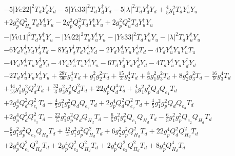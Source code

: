 {\begin{align}
 &-5 |Ye22|^2 {T_d  Y_{d}^{\dagger}  Y_d} -5 |Ye33|^2 {T_d  Y_{d}^{\dagger}  Y_d} -5 |\lambda|^2 {T_d  Y_{d}^{\dagger}  Y_d} +\frac{4}{5} g_{1}^{2} {T_d  Y_{u}^{\dagger}  Y_u} \nonumber \\ 
 &+2 g_{p}^{2} Q_{H_u}^{2} {T_d  Y_{u}^{\dagger}  Y_u} -2 g_{p}^{2} Q_{q}^{2} {T_d  Y_{u}^{\dagger}  Y_u} +2 g_{p}^{2} Q_{u}^{2} {T_d  Y_{u}^{\dagger}  Y_u} \nonumber \\ 
 &- |Yv11|^2 {T_d  Y_{u}^{\dagger}  Y_u} - |Yv22|^2 {T_d  Y_{u}^{\dagger}  Y_u} - |Yv33|^2 {T_d  Y_{u}^{\dagger}  Y_u} - |\lambda|^2 {T_d  Y_{u}^{\dagger}  Y_u} \nonumber \\ 
 &-6 {Y_d  Y_{d}^{\dagger}  Y_d  Y_{d}^{\dagger}  T_d} -8 {Y_d  Y_{d}^{\dagger}  T_d  Y_{d}^{\dagger}  Y_d} -2 {Y_d  Y_{u}^{\dagger}  Y_u  Y_{d}^{\dagger}  T_d} -4 {Y_d  Y_{u}^{\dagger}  Y_u  Y_{u}^{\dagger}  T_u} \nonumber \\ 
 &-4 {Y_d  Y_{u}^{\dagger}  T_u  Y_{d}^{\dagger}  Y_d} -4 {Y_d  Y_{u}^{\dagger}  T_u  Y_{u}^{\dagger}  Y_u} -6 {T_d  Y_{d}^{\dagger}  Y_d  Y_{d}^{\dagger}  Y_d} -4 {T_d  Y_{u}^{\dagger}  Y_u  Y_{d}^{\dagger}  Y_d} \nonumber \\ 
 &-2 {T_d  Y_{u}^{\dagger}  Y_u  Y_{u}^{\dagger}  Y_u} +\frac{287}{90} g_{1}^{4} T_d +g_{1}^{2} g_{2}^{2} T_d +\frac{15}{2} g_{2}^{4} T_d +\frac{8}{9} g_{1}^{2} g_{3}^{2} T_d +8 g_{2}^{2} g_{3}^{2} T_d -\frac{16}{9} g_{3}^{4} T_d \nonumber \\ 
 &+\frac{44}{15} g_{1}^{2} g_{p}^{2} Q_{d}^{2} T_d +\frac{32}{3} g_{3}^{2} g_{p}^{2} Q_{d}^{2} T_d +22 g_{p}^{4} Q_{d}^{4} T_d +\frac{4}{5} g_{1}^{2} g_{p}^{2} Q_{d} Q_{e_{1}} T_d \nonumber \\ 
 &+2 g_{p}^{4} Q_{d}^{2} Q_{e_{1}}^{2} T_d +\frac{4}{5} g_{1}^{2} g_{p}^{2} Q_{d} Q_{e_{2}} T_d +2 g_{p}^{4} Q_{d}^{2} Q_{e_{2}}^{2} T_d +\frac{4}{5} g_{1}^{2} g_{p}^{2} Q_{d} Q_{e_3} T_d \nonumber \\ 
 &+2 g_{p}^{4} Q_{d}^{2} Q_{e_3}^{2} T_d -\frac{22}{5} g_{1}^{2} g_{p}^{2} Q_{d} Q_{H_d} T_d -\frac{6}{5} g_{1}^{2} g_{p}^{2} Q_{e_{1}} Q_{H_d} T_d -\frac{6}{5} g_{1}^{2} g_{p}^{2} Q_{e_{2}} Q_{H_d} T_d \nonumber \\ 
 &-\frac{6}{5} g_{1}^{2} g_{p}^{2} Q_{e_3} Q_{H_d} T_d +\frac{12}{5} g_{1}^{2} g_{p}^{2} Q_{H_d}^{2} T_d +6 g_{2}^{2} g_{p}^{2} Q_{H_d}^{2} T_d +22 g_{p}^{4} Q_{d}^{2} Q_{H_d}^{2} T_d \nonumber \\ 
 &+2 g_{p}^{4} Q_{e_{1}}^{2} Q_{H_d}^{2} T_d +2 g_{p}^{4} Q_{e_{2}}^{2} Q_{H_d}^{2} T_d +2 g_{p}^{4} Q_{e_3}^{2} Q_{H_d}^{2} T_d +8 g_{p}^{4} Q_{H_d}^{4} T_d \nonumber \\ 

\end{align}}
